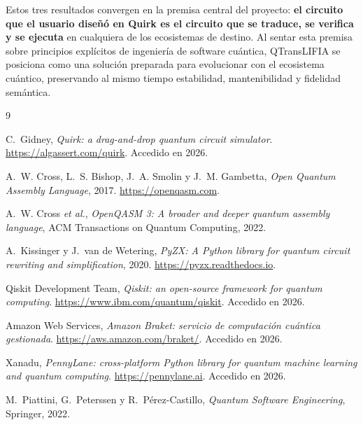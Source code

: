 \documentclass[11pt,a4paper]{article}
\begin{document}
Estos tres resultados convergen en la premisa central del proyecto:
\textbf{el circuito que el usuario diseñó en Quirk es el circuito que se traduce, se verifica
y se ejecuta} en cualquiera de los ecosistemas de destino. Al sentar esta premisa sobre
principios explícitos de ingeniería de software cuántica, QTransLIFIA se posiciona como una
solución preparada para evolucionar con el ecosistema cuántico, preservando al mismo tiempo
estabilidad, mantenibilidad y fidelidad semántica.

\begin{thebibliography}{9}

C.~Gidney, \emph{Quirk: a drag-and-drop quantum circuit simulator}.
\url{https://algassert.com/quirk}. Accedido en 2026.

A.~W. Cross, L.~S. Bishop, J.~A. Smolin y J.~M. Gambetta,
\emph{Open Quantum Assembly Language}, 2017. \url{https://openqasm.com}.

A.~W. Cross \emph{et al.}, \emph{OpenQASM 3: A broader and deeper quantum assembly language},
ACM Transactions on Quantum Computing, 2022.

A.~Kissinger y J.~van de Wetering, \emph{PyZX: A Python library for quantum circuit
rewriting and simplification}, 2020. \url{https://pyzx.readthedocs.io}.

Qiskit Development Team, \emph{Qiskit: an open-source framework for quantum computing}.
\url{https://www.ibm.com/quantum/qiskit}. Accedido en 2026.

Amazon Web Services, \emph{Amazon Braket: servicio de computación cuántica gestionada}.
\url{https://aws.amazon.com/braket/}. Accedido en 2026.

Xanadu, \emph{PennyLane: cross-platform Python library for quantum machine learning and
quantum computing}. \url{https://pennylane.ai}. Accedido en 2026.

M.~Piattini, G.~Peterssen y R.~Pérez-Castillo, \emph{Quantum Software Engineering},
Springer, 2022.

\end{thebibliography}
\end{document}
